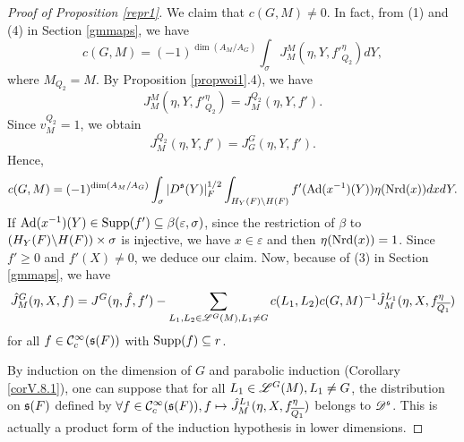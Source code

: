 \documentclass[a4paper]{amsart}
\newcommand{\ov}{\overline}
\theoremstyle{definition}
\theoremstyle{remark}
\numberwithin{equation}{subsection}
\begin{document}
\begin{proof}[Proof of Proposition \ref{repr1}]
We claim that $c(G, M)\neq0$. 
In fact, from (1) and (4) in Section \ref{gmmaps}, we have
$$ c(G,M)=(-1)^{\dim(A_M/A_G)} \int_{\sigma} J_M^{M}(\eta,Y,{f'}_{Q_2}^\eta) dY, $$
where $M_{Q_2}=M$. 
By Proposition \ref{propwoi1}.4), we have
$$ J_M^{M}(\eta,Y,{f'}_{Q_2}^\eta)=J_M^{Q_2}(\eta,Y,f'). $$
Since $v_M^{Q_2}=1$, we obtain
$$ J_M^{Q_2}(\eta,Y,f')=J_G^G(\eta,Y,f'). $$
Hence, 
$$ c(G,M)=(-1)^{\dim(A_M/A_G)} \int_{\sigma} |D^{\mathfrak{s}}(Y)|_F^{1/2} \int_{H_Y(F)\backslash H(F)} f'({\mathrm{Ad}}(x^{-1})(Y))\eta({\mathrm{Nrd}}(x))dx dY. $$
If ${\mathrm{Ad}}(x^{-1})(Y)\in{\mathrm{Supp}}(f')\subseteq\beta(\varepsilon, \sigma)$, since the restriction of $\beta$ to $(H_Y(F)\backslash H(F))\times\sigma$ is injective, we have $x\in\varepsilon$ and then $\eta({\mathrm{Nrd}}(x))=1$. Since $f'\geq0$ and $f'(X)\neq0$, we deduce our claim. Now, because of (3) in Section \ref{gmmaps}, we have 
\begin{equation}\label{equV.10.(2)}
 \hat{J}_M^G(\eta, X, f)=J^G(\eta,\hat{f},f')-\sum_{L_1,L_2\in\msl^G(M), L_1\neq G} c(L_1,L_2) c(G,M)^{-1} \hat{J}_M^{L_1}(\eta, X, f_{\ov{Q_1}}^\eta) 
\end{equation}
for all $f\in{\mathcal {C}}_c^\infty({\mathfrak{s}}(F))$ with ${\mathrm{Supp}}(f)\subseteq r$. 

By induction on the dimension of $G$ and parabolic induction (Corollary \ref{corV.8.1}), one can suppose that for all $L_1\in\mathscr{L}^G(M), L_1\neq G$, the distribution on ${\mathfrak{s}}(F)$ defined by $\forall f\in\CC_c^\infty(\fs(F)), f\mapsto\hat{J}_M^{L_1}(\eta, X, f_{\ov{Q_1}}^\eta)$ belongs to $\mathscr{D}^{\mathfrak{s}}$. This is actually a product form of the induction hypothesis in lower dimensions. 


\end{proof}
\end{document}
